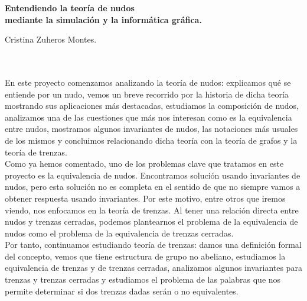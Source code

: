 
\cleardoublepage
\thispagestyle{empty}

\begin{center}
{\large\bfseries Entendiendo la teoría de nudos\\
	 mediante la simulación y la informática gráfica.}\\
\end{center}
\begin{center}
Cristina Zuheros Montes.\\
\end{center}

\\

\vspace{0.7cm}
\\
En este proyecto comenzamos analizando la teoría de nudos: explicamos qué se entiende por un nudo, vemos un breve recorrido por la historia de dicha teoría mostrando sus aplicaciones más destacadas, estudiamos la composición de nudos, analizamos una de las cuestiones que más nos interesan como es la equivalencia entre nudos, mostramos algunos invariantes de nudos, las notaciones más usuales de los mismos y concluimos relacionando dicha teoría con la teoría de grafos y la teoría de trenzas.\\

Como ya hemos comentado, uno de los problemas clave que tratamos en este proyecto es la equivalencia de nudos. Encontramos solución usando invariantes de nudos, pero esta solución no es completa en el sentido de que no siempre vamos a obtener respuesta usando invariantes. Por este motivo, entre otros que iremos viendo, nos enfocamos en la teoría de trenzas. Al tener una relación directa entre nudos y trenzas cerradas, podemos plantearnos el problema de la equivalencia de nudos como el problema de la equivalencia de trenzas cerradas.\\ 

Por tanto, continuamos estudiando teoría de trenzas: damos una definición formal del concepto, vemos que tiene estructura de grupo no abeliano, estudiamos la equivalencia de trenzas y de trenzas cerradas, analizamos algunos invariantes para trenzas y trenzas cerradas y estudiamos el problema de las palabras que nos permite determinar si dos trenzas dadas serán o no equivalentes. \\


